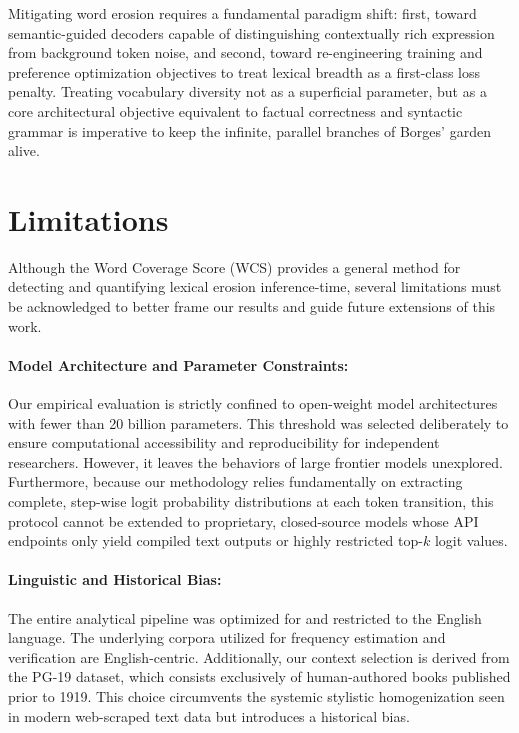 \documentclass{article}
\begin{document}
Mitigating word erosion requires a fundamental paradigm shift: first, toward semantic-guided decoders capable of distinguishing contextually rich expression from background token noise, and second, toward re-engineering training and preference optimization objectives to treat lexical breadth as a first-class loss penalty. Treating vocabulary diversity not as a superficial parameter, but as a core architectural objective equivalent to factual correctness and syntactic grammar is imperative to keep the infinite, parallel branches of Borges' garden alive.



\section{Limitations}
\label{sec:limitations}

Although the Word Coverage Score (WCS) provides a general method for detecting and quantifying lexical erosion inference-time, several limitations must be acknowledged to better frame our results and guide future extensions of this work.

\paragraph{Model Architecture and Parameter Constraints:}
Our empirical evaluation is strictly confined to open-weight model architectures with fewer than 20 billion parameters. This threshold was selected deliberately to ensure computational accessibility and reproducibility for independent researchers. However, it leaves the behaviors of large frontier models unexplored. Furthermore, because our methodology relies fundamentally on extracting complete, step-wise logit probability distributions at each token transition, this protocol cannot be extended to proprietary, closed-source models whose API endpoints only yield compiled text outputs or highly restricted top-$k$ logit values.

\paragraph{Linguistic and Historical Bias:}
The entire analytical pipeline was optimized for and restricted to the English language. The underlying corpora utilized for frequency estimation and verification are  English-centric. Additionally, our context selection is derived from the PG-19 dataset, which consists exclusively of human-authored books published prior to 1919. This choice circumvents the systemic stylistic homogenization seen in modern web-scraped text data but introduces a historical bias.
\end{document}
